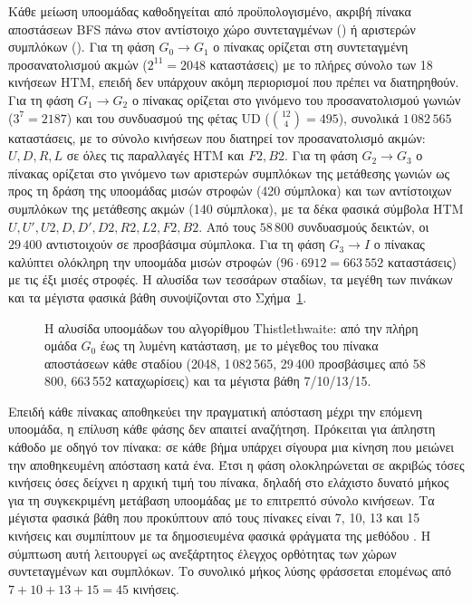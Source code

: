 Κάθε μείωση υποομάδας καθοδηγείται από προϋπολογισμένο, ακριβή πίνακα αποστάσεων BFS πάνω στον αντίστοιχο χώρο συντεταγμένων () ή αριστερών συμπλόκων (). Για τη φάση \(G_0 \rightarrow G_1\) ο πίνακας ορίζεται στη συντεταγμένη προσανατολισμού ακμών (\(2^{11}=2048\) καταστάσεις) με το πλήρες σύνολο των 18 κινήσεων HTM, επειδή δεν υπάρχουν ακόμη περιορισμοί που πρέπει να διατηρηθούν. Για τη φάση \(G_1 \rightarrow G_2\) ο πίνακας ορίζεται στο γινόμενο του προσανατολισμού γωνιών (\(3^7=2187\)) και του συνδυασμού της φέτας UD (\(\binom{12}{4}=495\)), συνολικά \(1\,082\,565\) καταστάσεις, με το σύνολο κινήσεων που διατηρεί τον προσανατολισμό ακμών: \(U,D,R,L\) σε όλες τις παραλλαγές HTM και \(F2,B2\). Για τη φάση \(G_2 \rightarrow G_3\) ο πίνακας ορίζεται στο γινόμενο των αριστερών συμπλόκων της μετάθεσης γωνιών ως προς τη δράση της υποομάδας μισών στροφών (420 σύμπλοκα) και των αντίστοιχων συμπλόκων της μετάθεσης ακμών (140 σύμπλοκα), με τα δέκα φασικά σύμβολα HTM \(U,U',U2,D,D',D2,R2,L2,F2,B2\). Από τους \(58\,800\) συνδυασμούς δεικτών, οι \(29\,400\) αντιστοιχούν σε προσβάσιμα σύμπλοκα. Για τη φάση \(G_3 \rightarrow I\) ο πίνακας καλύπτει ολόκληρη την υποομάδα μισών στροφών (\(96\cdot 6912=663\,552\) καταστάσεις) με τις έξι μισές στροφές. Η αλυσίδα των τεσσάρων σταδίων, τα μεγέθη των πινάκων και τα μέγιστα φασικά βάθη συνοψίζονται στο Σχήμα~\ref{fig:thistlethwaite-chain}.

\begin{figure}[htbp]\centering

\caption{Η αλυσίδα υποομάδων του αλγορίθμου Thistlethwaite: από την πλήρη ομάδα \(G_0\) έως τη λυμένη κατάσταση, με το μέγεθος του πίνακα αποστάσεων κάθε σταδίου (2048, 1\,082\,565, 29\,400 προσβάσιμες από 58\,800, 663\,552 καταχωρίσεις) και τα μέγιστα βάθη 7/10/13/15.}
\label{fig:thistlethwaite-chain}
\end{figure}

Επειδή κάθε πίνακας αποθηκεύει την πραγματική απόσταση μέχρι την επόμενη υποομάδα, η επίλυση κάθε φάσης δεν απαιτεί αναζήτηση. Πρόκειται για άπληστη κάθοδο με οδηγό τον πίνακα: σε κάθε βήμα υπάρχει σίγουρα μια κίνηση που μειώνει την αποθηκευμένη απόσταση κατά ένα. Έτσι η φάση ολοκληρώνεται σε ακριβώς τόσες κινήσεις όσες δείχνει η αρχική τιμή του πίνακα, δηλαδή στο ελάχιστο δυνατό μήκος για τη συγκεκριμένη μετάβαση υποομάδας με το επιτρεπτό σύνολο κινήσεων. Τα μέγιστα φασικά βάθη που προκύπτουν από τους πίνακες είναι 7, 10, 13 και 15 κινήσεις και συμπίπτουν με τα δημοσιευμένα φασικά φράγματα της μεθόδου \cite{scherphuisThistlethwaite}. Η σύμπτωση αυτή λειτουργεί ως ανεξάρτητος έλεγχος ορθότητας των χώρων συντεταγμένων και συμπλόκων. Το συνολικό μήκος λύσης φράσσεται επομένως από \(7+10+13+15=45\) κινήσεις.

